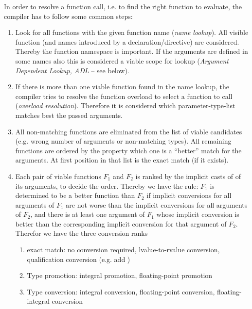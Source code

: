 In order to resolve a function call, i.e. to find the right function to evaluate, the compiler has to follow some common steps:
\begin{enumerate}
  \item Look for all functions with the given function name (\emph{name lookup}). All visible function (and names introduced by a 
        declaration/directive) are considered. Thereby the function namespace is important. If the arguments are defined in some names also this
        is considered a viable scope for lookup (\emph{Argument Dependent Lookup, ADL} -- see below).
  \item If there is more than one viable function found in the name lookup, the compiler tries to resolve the function overload to select a
        function to call (\emph{overload resolution}). Therefore it is considered which parameter-type-list matches best the passed arguments.
  \item All non-matching functions are eliminated from the list of viable candidates (e.g. wrong number of arguments or non-matching types). All
        remaining functions are ordered by the property which one is a ``better'' match for the arguments. At first position in that list is the exact
        match (if it exists).
  \item Each pair of viable functions $F_1$ and $F_2$ is ranked by the implicit casts of of its arguments, to decide the order. Thereby we have the rule:
        $F_1$ is determined to be a better function than $F_2$ if implicit conversions for all arguments of $F_1$ are not worse than the implicit
        conversions for all arguments of $F_2$, and there is at least one argument of $F_1$ whose implicit conversion is better than the corresponding
        implicit conversion for that argument of $F_2$. Therefor we have the three conversion ranks
        \begin{enumerate}
          \item exact match: no conversion required, lvalue-to-rvalue conversion, qualification conversion (e.g. add )
          \item Type promotion: integral promotion, floating-point promotion
          \item Type conversion: integral conversion, floating-point conversion, floating-integral conversion
        \end{enumerate}
\end{enumerate}

